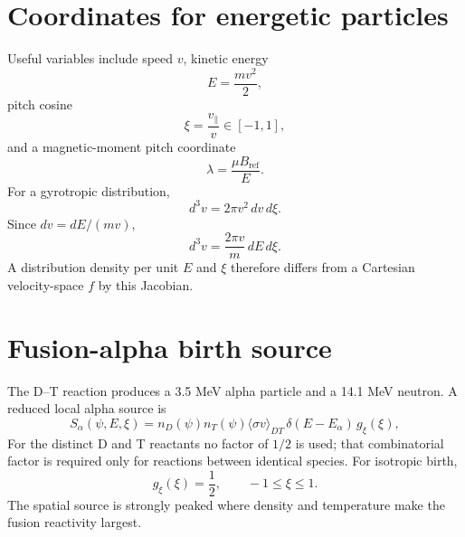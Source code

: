 \documentclass[11pt]{article}
\begin{document}
\section{Coordinates for energetic particles}
Useful variables include speed $v$, kinetic energy
\begin{equation}
E=\frac{mv^2}{2},
\end{equation}
pitch cosine
\begin{equation}
\xi=\frac{v_\parallel}{v}\in[-1,1],
\end{equation}
and a magnetic-moment pitch coordinate
\begin{equation}
\lambda=\frac{\mu B_{\mathrm{ref}}}{E}.
\end{equation}
For a gyrotropic distribution,
\begin{equation}
d^3v=2\pi v^2\,dv\,d\xi.
\end{equation}
Since $dv=dE/(mv)$,
\begin{equation}
d^3v=\frac{2\pi v}{m}\,dE\,d\xi.
\end{equation}
A distribution density per unit $E$ and $\xi$ therefore differs from a Cartesian velocity-space $f$ by this Jacobian.

\section{Fusion-alpha birth source}
The D--T reaction produces a 3.5 MeV alpha particle and a 14.1 MeV neutron. A reduced local alpha source is
\begin{equation}
S_\alpha(\psi,E,\xi)=
n_D(\psi)n_T(\psi)\langle\sigma v\rangle_{DT}
\,\delta(E-E_\alpha)\,g_\xi(\xi),
\end{equation}
For the distinct D and T reactants no factor of $1/2$ is used; that combinatorial factor is required only for reactions between identical species. For isotropic birth,
\begin{equation}
g_\xi(\xi)=\frac{1}{2},\qquad -1\le\xi\le1.
\end{equation}
The spatial source is strongly peaked where density and temperature make the fusion reactivity largest.
\end{document}
